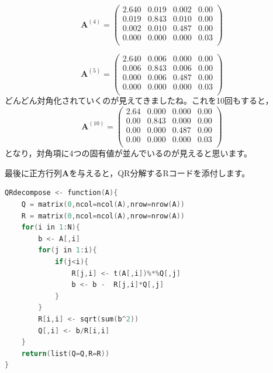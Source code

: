 \documentclass{ltjsbook}
\begin{document}
\[
	\bm{A}^{(4)} =
	\begin{pmatrix}
		2.640 & 0.019 & 0.002 & 0.00 \\
		0.019 & 0.843 & 0.010 & 0.00 \\
		0.002 & 0.010 & 0.487 & 0.00 \\
		0.000 & 0.000 & 0.000 & 0.03 \\
	\end{pmatrix}
\]

\[
	\bm{A}^{(5)} =
	\begin{pmatrix}
		2.640 & 0.006 & 0.000 & 0.00 \\
		0.006 & 0.843 & 0.006 & 0.00 \\
		0.000 & 0.006 & 0.487 & 0.00 \\
		0.000 & 0.000 & 0.000 & 0.03 \\
	\end{pmatrix}
\]
どんどん対角化されていくのが見えてきましたね。これを10回もすると，
\[
	\bm{A}^{(10)} =
	\begin{pmatrix}
		2.64 & 0.000 & 0.000 & 0.00 \\
		0.00 & 0.843 & 0.000 & 0.00 \\
		0.00 & 0.000 & 0.487 & 0.00 \\
		0.00 & 0.000 & 0.000 & 0.03 \\
	\end{pmatrix}
\]
となり，対角項に4つの固有値が並んでいるのが見えると思います。


最後に正方行列$\bm{A}$を与えると，QR分解するRコードを添付します。
\begin{lstlisting}[language=C++,label={QRdecompose},caption={QR分解するRコード}]
QRdecompose <- function(A){
    Q = matrix(0,ncol=ncol(A),nrow=nrow(A))
    R = matrix(0,ncol=ncol(A),nrow=nrow(A))
    for(i in 1:N){
        b <- A[,i]
        for(j in 1:i){
            if(j<i){
                R[j,i] <- t(A[,i])%*%Q[,j]
                b <- b -  R[j,i]*Q[,j]
            }
        }
        R[i,i] <- sqrt(sum(b^2))
        Q[,i] <- b/R[i,i]
    }
    return(list(Q=Q,R=R))
}
\end{lstlisting}
\end{document}

